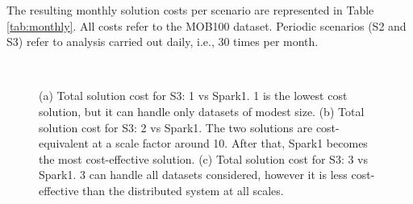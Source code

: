 {The resulting monthly solution costs per scenario are represented in Table \ref{tab:monthly}. All costs refer to the MOB100 dataset. Periodic scenarios (S2 and S3) refer to analysis carried out daily, i.e., 30 times per month.

\begin{figure}[p]
  \centering
    \\
\caption{(a) Total solution cost for S3: \sti{}1 vs Spark1. \sti{}1 is the lowest cost solution, but it can handle only datasets of modest size. (b) Total solution cost for S3: \sti{}2 vs Spark1. The two solutions are cost-equivalent at a scale factor around 10. After that, Spark1 becomes the most cost-effective solution. (c) Total solution cost for S3: \sti{}3 vs Spark1. \sti{}3 can handle all datasets considered, however it is less cost-effective than the distributed system at all scales.}
\label{fig:NvsSpark}
\end{figure}

}
